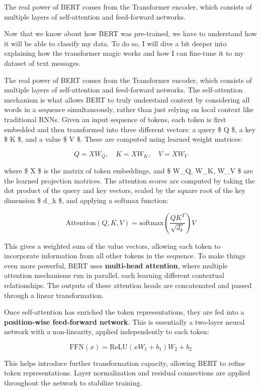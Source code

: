 \documentclass[11pt]{article}
\begin{document}
The real power of BERT comes from the Transformer encoder, which
consists of multiple layers of self-attention and feed-forward networks.

Now that we know about how BERT was pre-trained, we have to understand
how it will be able to classify my data. To do so, I will dive a bit
deeper into explaining how the transformer magic works and how I can
fine-tune it to my dataset of text messages.

The real power of BERT comes from the Transformer encoder, which
consists of multiple layers of self-attention and feed-forward networks.
The self-attention mechanism is what allows BERT to truly understand
context by considering all words in a sequence simultaneously, rather
than just relying on local context like traditional RNNs. Given an input
sequence of tokens, each token is first embedded and then transformed
into three different vectors: a query \$ Q \$, a key \$ K \$, and a
value \$ V \$. These are computed using learned weight matrices:

\[
Q = XW_Q, \quad K = XW_K, \quad V = XW_V
\]

where \$ X \$ is the matrix of token embeddings, and \$ W\_Q, W\_K, W\_V
\$ are the learned projection matrices. The attention scores are
computed by taking the dot product of the query and key vectors, scaled
by the square root of the key dimension \$ d\_k \$, and applying a
softmax function:

\[
\text{Attention}(Q, K, V) = \text{softmax} \left( \frac{QK^T}{\sqrt{d_k}} \right) V
\]

This gives a weighted sum of the value vectors, allowing each token to
incorporate information from all other tokens in the sequence. To make
things even more powerful, BERT uses \textbf{multi-head attention},
where multiple attention mechanisms run in parallel, each learning
different contextual relationships. The outputs of these attention heads
are concatenated and passed through a linear transformation.

Once self-attention has enriched the token representations, they are fed
into a \textbf{position-wise feed-forward network}. This is essentially
a two-layer neural network with a non-linearity, applied independently
to each token:

\[
\text{FFN}(x) = \text{ReLU}(xW_1 + b_1) W_2 + b_2
\]

This helps introduce further transformation capacity, allowing BERT to
refine token representations. Layer normalization and residual
connections are applied throughout the network to stabilize training.
\end{document}
